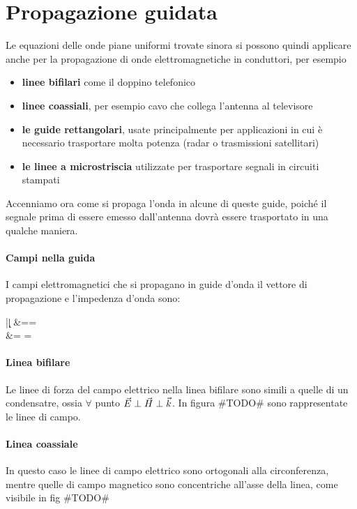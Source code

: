 \section{Propagazione guidata}
Le equazioni delle onde piane uniformi trovate sinora si possono quindi applicare anche per la propagazione di onde elettromagnetiche in conduttori, per esempio
\begin{itemize}
  \item \textbf{linee bifilari} come il doppino telefonico
  \item \textbf{linee coassiali}, per esempio  cavo che collega l'antenna al televisore
  \item \textbf{le guide rettangolari}, usate principalmente per applicazioni in cui è necessario trasportare molta potenza (radar o trasmissioni satellitari)
  \item \textbf{le linee a microstriscia} utilizzate per trasportare segnali in circuiti stampati
\end{itemize}
Accenniamo ora come si propaga l'onda in alcune di queste guide, poiché il segnale prima di essere emesso dall'antenna dovrà essere trasportato in una qualche maniera.
\paragraph{Campi nella guida}

I campi elettromagnetici che si propagano in guide d'onda il vettore di propagazione  e l'impedenza d'onda sono:
\begin{esp}
  |\k| &=\beta= \omega \sqrt{\mu \epsilon} \\
  \eta &=  = \sqrt{\frac{\mu}{\epsilon}}
\end{esp}

\paragraph{Linea bifilare}
Le linee di forza del campo elettrico nella linea bifilare sono simili a quelle di un condensatre, ossia $\forall$ punto $\vec{E}\perp\vec{H}\perp\vec{k}$. In figura \#TODO\# sono rappresentate le linee di campo.

\paragraph{Linea coassiale}
In questo caso le linee di campo elettrico sono ortogonali alla circonferenza, mentre quelle di campo magnetico sono concentriche all'asse della linea, come visibile in fig \#TODO\#

